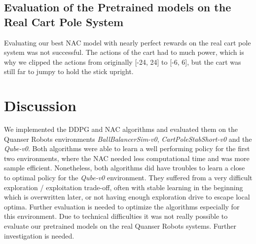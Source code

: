 \subsection{Evaluation of the Pretrained models on the Real Cart Pole System}
Evaluating our best NAC model with nearly perfect rewards on the real cart pole system was not successful. The actions of the cart had to much power, which is why we clipped the actions from originally [-24, 24] to [-6, 6], but the cart was still far to jumpy to hold the stick upright.




\section{Discussion}
We implemented the DDPG and NAC algorithms and evaluated them on the Quanser Robots environments \textit{BallBalancerSim-v0}, \textit{CartPoleStabShort-v0} and the \textit{Qube-v0}. Both algorithms were able to learn a well performing policy for the first two environments, where the NAC needed less computational time and was more sample efficient. Nonetheless, both algorithms did have troubles to learn a close to optimal policy for the \textit{Qube-v0} environment. They suffered from a very difficult exploration / exploitation trade-off, often with stable learning in the beginning which is overwritten later, or not having enough exploration drive to escape local optima. Further evaluation is needed to optimize the algorithms especially for this environment. Due to technical difficulties it was not really possible to evaluate our pretrained models on the real Quanser Robots systems. Further investigation is needed.
\label{sec:conclusion}






